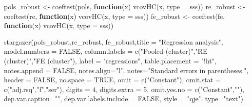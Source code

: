 \documentclass[
]{article}
\newenvironment{Shaded}{\begin{snugshade}}{\end{snugshade}}
\newcommand{\AttributeTok}[1]{\textcolor[rgb]{0.77,0.63,0.00}{#1}}
\newcommand{\ConstantTok}[1]{\textcolor[rgb]{0.00,0.00,0.00}{#1}}
\newcommand{\ControlFlowTok}[1]{\textcolor[rgb]{0.13,0.29,0.53}{\textbf{#1}}}
\newcommand{\DecValTok}[1]{\textcolor[rgb]{0.00,0.00,0.81}{#1}}
\newcommand{\FunctionTok}[1]{\textcolor[rgb]{0.00,0.00,0.00}{#1}}
\newcommand{\NormalTok}[1]{#1}
\newcommand{\OtherTok}[1]{\textcolor[rgb]{0.56,0.35,0.01}{#1}}
\newcommand{\StringTok}[1]{\textcolor[rgb]{0.31,0.60,0.02}{#1}}
\begin{document}
\begin{Shaded}
\begin{Highlighting}[]
\NormalTok{  pols\_robust }\OtherTok{\textless{}{-}} \FunctionTok{coeftest}\NormalTok{(pols, }\ControlFlowTok{function}\NormalTok{(x) }\FunctionTok{vcovHC}\NormalTok{(x, }\AttributeTok{type =} \StringTok{\textquotesingle{}sss\textquotesingle{}}\NormalTok{)) }
\NormalTok{  re\_robust }\OtherTok{\textless{}{-}} \FunctionTok{coeftest}\NormalTok{(re, }\ControlFlowTok{function}\NormalTok{(x) }\FunctionTok{vcovHC}\NormalTok{(x, }\AttributeTok{type =} \StringTok{\textquotesingle{}sss\textquotesingle{}}\NormalTok{)) }
\NormalTok{  fe\_robust }\OtherTok{\textless{}{-}} \FunctionTok{coeftest}\NormalTok{(fe, }\ControlFlowTok{function}\NormalTok{(x) }\FunctionTok{vcovHC}\NormalTok{(x, }\AttributeTok{type =} \StringTok{\textquotesingle{}sss\textquotesingle{}}\NormalTok{)) }
  
  \FunctionTok{stargazer}\NormalTok{(pols\_robust,re\_robust, fe\_robust,}\AttributeTok{title =} \StringTok{"Regression analysis"}\NormalTok{, }
            \AttributeTok{model.numbers =} \ConstantTok{FALSE}\NormalTok{,}
            \AttributeTok{column.labels =} \FunctionTok{c}\NormalTok{(}\StringTok{"Pooled (cluster)"}\NormalTok{,}\StringTok{"RE (cluster)"}\NormalTok{,}\StringTok{"FE (cluster"}\NormalTok{),}
            \AttributeTok{label =} \StringTok{"regressions"}\NormalTok{,}
            \AttributeTok{table.placement =} \StringTok{"!ht"}\NormalTok{,}
            \AttributeTok{notes.append =} \ConstantTok{FALSE}\NormalTok{,}
            \AttributeTok{notes.align=}\StringTok{"l"}\NormalTok{,}
            \AttributeTok{notes=}\StringTok{"Standard errors in parentheses."}\NormalTok{,}
            \AttributeTok{header =} \ConstantTok{FALSE}\NormalTok{,}
            \AttributeTok{no.space =} \ConstantTok{TRUE}\NormalTok{,}
            \AttributeTok{omit =} \FunctionTok{c}\NormalTok{(}\StringTok{"Constant"}\NormalTok{),}
            \AttributeTok{omit.stat =} \FunctionTok{c}\NormalTok{(}\StringTok{"adj.rsq"}\NormalTok{,}\StringTok{"f"}\NormalTok{,}\StringTok{"ser"}\NormalTok{),}
            \AttributeTok{digits =} \DecValTok{4}\NormalTok{,}
            \AttributeTok{digits.extra =} \DecValTok{5}\NormalTok{,}
            \AttributeTok{omit.yes.no =} \FunctionTok{c}\NormalTok{(}\StringTok{"Constant"}\NormalTok{,}\StringTok{""}\NormalTok{),}
            \AttributeTok{dep.var.caption=}\StringTok{""}\NormalTok{,}
            \AttributeTok{dep.var.labels.include =} \ConstantTok{FALSE}\NormalTok{,}
            \AttributeTok{style =} \StringTok{"qje"}\NormalTok{,}
            \AttributeTok{type=}\StringTok{"text"}\NormalTok{)}
\end{Highlighting}
\end{Shaded}
\end{document}
